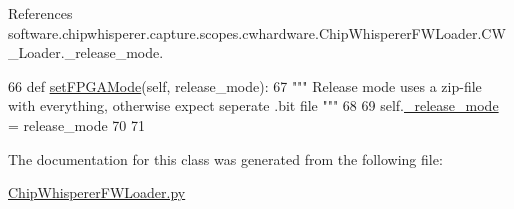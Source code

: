 References software.\+chipwhisperer.\+capture.\+scopes.\+cwhardware.\+Chip\+Whisperer\+F\+W\+Loader.\+C\+W\+\_\+\+Loader.\+\_\+release\+\_\+mode.


\begin{DoxyCode}
66     \textcolor{keyword}{def }\hyperlink{classsoftware_1_1chipwhisperer_1_1capture_1_1scopes_1_1cwhardware_1_1ChipWhispererFWLoader_1_1CW__Loader_a08b83b4a6789cc02ee7639e11febe017}{setFPGAMode}(self, release\_mode):
67         \textcolor{stringliteral}{""" Release mode uses a zip-file with everything, otherwise expect seperate .bit file """}
68         
69         self.\hyperlink{classsoftware_1_1chipwhisperer_1_1capture_1_1scopes_1_1cwhardware_1_1ChipWhispererFWLoader_1_1CW__Loader_a1e58fbae945a6db68705d224a9abb47d}{\_release\_mode} = release\_mode
70 
71 
\end{DoxyCode}


The documentation for this class was generated from the following file\+:\begin{DoxyCompactItemize}
\item 
\hyperlink{ChipWhispererFWLoader_8py}{Chip\+Whisperer\+F\+W\+Loader.\+py}\end{DoxyCompactItemize}
